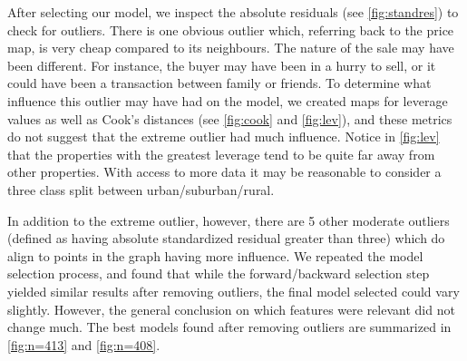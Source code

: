After selecting our model, we inspect the absolute residuals (see \cref{fig:standres}) to check for outliers. There is one obvious
outlier which, referring back to the price map, is very cheap compared to its neighbours. The nature of the sale may have been
different. For instance, the buyer may have been in a hurry to sell, or it could have been a transaction between family or
friends. To determine what influence this outlier may have had on the model, we created maps for leverage values as well as Cook's
distances (see \cref{fig:cook} and \cref{fig:lev}), and these metrics do not suggest that the extreme outlier had much influence.
Notice in \cref{fig:lev} that the properties with the greatest leverage tend to be quite far away from other properties. With
access to more data it may be reasonable to consider a three class split between urban/suburban/rural.

In addition to the extreme outlier, however, there are 5 other moderate outliers (defined as having absolute standardized residual
greater than three) which do align to points in the graph having more influence. We repeated the model selection process, and
found that while the forward/backward selection step yielded similar results after removing outliers, the final model selected
could vary slightly. However, the general conclusion on which features were relevant did not change much. The best models found
after removing outliers are summarized in \cref{fig:n=413} and \cref{fig:n=408}.





